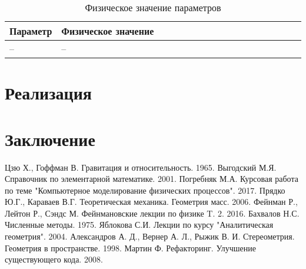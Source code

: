 \documentclass[12pt, a4paper]{extarticle}
\numberwithin{equation}{section}
\begin{document}
\begin{table}[h]
	\caption{Физическое значение параметров}
	\label{parameters}
	\begin{center}
		\begin{tabularx}{\textwidth}{p{0.15\linewidth}p{0.85\linewidth}}
			
			\hline
			\rule{0cm}{0,5cm}
			Параметр &  Физическое значение \\ 
			[3pt]\hline
			-- & -- \\
			\hline
		\end{tabularx}
	\end{center}
\end{table}

 
\section{Реализация} 
 

\newpage
\section*{Заключение}

\newpage

\begin{thebibliography}{**}
	  
	Цзю Х., Гоффман В. Гравитация и относительность. 1965.
	Выгодский М.Я. Справочник по элементарной математике. 2001.
	Погребняк М.А. Курсовая работа по теме "Компьютерное моделирование физических процессов". 2017.
	 Прядко Ю.Г., Караваев В.Г. Теоретическая механика. Геометрия масс. 2006.
	Фейнман Р., Лейтон Р., Сэндс М. Фейнмановские лекции по физике T. 2. 2016.
	 Бахвалов Н.С.  Численные методы. 1975. 
	 Яблокова С.И.   Лекции по курсу "Аналитическая геометрия". 2004. 
	Александров А. Д., Вернер А. Л., Рыжик В. И.  Стереометрия. Геометрия в пространстве. 1998. 
	Мартин Ф. Рефакторинг. Улучшение существующего кода. 2008.
\end{thebibliography}
\end{document}
